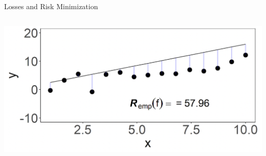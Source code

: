 \documentclass[11pt,compress,t,notes=noshow, xcolor=table]{beamer}
\begin{document}
\begin{vbframe}{Losses and Risk Minimization}
\begin{itemize}
\begin{columns}
\begin{column}{0.5\textwidth}
  \begin{center}
    \includegraphics[width=\textwidth]{slides/ml-basics/figure_man/nutshell-ml-basic-2-risk.png} 
  \end{center}
\end{column} 
\end{columns}
\end{itemize}







\end{vbframe}
\end{document}
